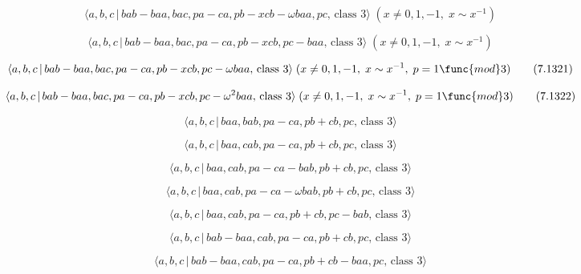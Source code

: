 \documentclass[10pt]{article}
\begin{document}
\begin{equation}
\langle a,b,c\,|\,bab-baa,bac,pa-ca,pb-xcb-\omega baa,pc,\,\text{class }%
3\rangle \;(x\neq 0,1,-1,\;x\sim x^{-1})  \tag{7.1319}
\end{equation}

\begin{equation}
\langle a,b,c\,|\,bab-baa,bac,pa-ca,pb-xcb,pc-baa,\,\text{class }3\rangle
\;(x\neq 0,1,-1,\;x\sim x^{-1})  \tag{7.1320}
\end{equation}

\begin{equation}
\langle a,b,c\,|\,bab-baa,bac,pa-ca,pb-xcb,pc-\omega baa,\,\text{class }%
3\rangle \;(x\neq 0,1,-1,\;x\sim x^{-1},\;p=1\func{mod}3)  \tag{7.1321}
\end{equation}

\begin{equation}
\langle a,b,c\,|\,bab-baa,bac,pa-ca,pb-xcb,pc-\omega ^{2}baa,\,\text{class }%
3\rangle \;(x\neq 0,1,-1,\;x\sim x^{-1},\;p=1\func{mod}3)  \tag{7.1322}
\end{equation}

\begin{equation}
\langle a,b,c\,|\,baa,bab,pa-ca,pb+cb,pc,\,\text{class }3\rangle 
\tag{7.1323}
\end{equation}

\begin{equation}
\langle a,b,c\,|\,baa,cab,pa-ca,pb+cb,pc,\,\text{class }3\rangle 
\tag{7.1324}
\end{equation}

\begin{equation}
\langle a,b,c\,|\,baa,cab,pa-ca-bab,pb+cb,pc,\,\text{class }3\rangle 
\tag{7.1325}
\end{equation}

\begin{equation}
\langle a,b,c\,|\,baa,cab,pa-ca-\omega bab,pb+cb,pc,\,\text{class }3\rangle 
\tag{7.1326}
\end{equation}

\begin{equation}
\langle a,b,c\,|\,baa,cab,pa-ca,pb+cb,pc-bab,\,\text{class }3\rangle 
\tag{7.1327}
\end{equation}

\begin{equation}
\langle a,b,c\,|\,bab-baa,cab,pa-ca,pb+cb,pc,\,\text{class }3\rangle 
\tag{7.1328}
\end{equation}

\begin{equation}
\langle a,b,c\,|\,bab-baa,cab,pa-ca,pb+cb-baa,pc,\,\text{class }3\rangle 
\tag{7.1329}
\end{equation}
\end{document}
